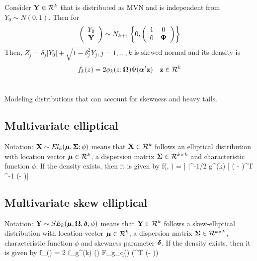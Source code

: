 \documentclass[11pt]{article}
\begin{document}
\linenumbers
\section*{\citep{Azzalini1996}}
Consider $\mbox{\bf Y} \in {\cal R}^k$ that is distributed as MVN and is independent from $Y_0 \sim N(0, 1)$. Then for
\begin{align}
\left( \begin{array}{c}
    Y_0\\
    \mbox{\bf Y}
\end{array} \right)
\sim
N_{k + 1} \left\{ 0, \left( 
    \begin{array}{c c}
    1 & 0 \\
    0 & \mbox{\boldmath $\Psi$}
    \end{array}
\right) \right\}
\end{align}
Then, $Z_j = \delta_j |Y_0| + \sqrt{ 1 - \delta_j^2} Y_j, j = 1, \ldots, k$ is skewed normal and its density is
\begin{align}
    f_k(z) = 2 \phi_k (z; \mbox{\boldmath $\Omega$}) \Phi (\mbox{\boldmath $\alpha$}^t \mbox{\bf z}) \quad \mbox{\bf z} \in {\cal R}^k
\end{align}

\section*{\citep{Azzalini1999}}

\section*{\citep{Branco2001}}
Modeling distributions that can account for skewness and heavy tails.

\subsection*{Multivariate elliptical}
Notation: $\mbox{\bf X} \sim El_k(\mbox{\boldmath $\mu$}, \mbox{\boldmath $\Sigma$}; \phi)$ means that $\mbox{\bf X} \in {\cal R}^k$ follows an elliptical distribution with location vector $\mbox{\boldmath $\mu$} \in {\cal R}^k$, a dispersion matrix $\mbox{\boldmath $\Sigma$} \in {\cal R}^{k \times k}$ and characteristic function $\phi$.
If the density exists, then it is given by
\beqn
    f(\bx \mid \bmu, \bSigma) = | \bSigma |^{-1/2} g^{(k)} [ ( \bx - \bmu)^T \bSigma^{-1} (\bx - \bmu)]
\eeqn

\subsection*{Multivariate skew elliptical}
Notation: $\mbox{\bf Y} \sim SE_k(\mbox{\boldmath $\mu$}, \mbox{\boldmath $\Omega$}, \mbox{\boldmath $\delta$}; \phi)$ means that $\mbox{\bf Y} \in {\cal R}^k$ follows a skew-elliptical distribution with location vector $\mbox{\boldmath $\mu$} \in {\cal R}^k$, a dispersion matrix $\mbox{\boldmath $\Sigma$} \in {\cal R}^{k \times k}$, characteristic function $\phi$ and skewness parameter $\mbox{\boldmath $\delta$}$.
If the density exists, then it is given by
\beqn
    f_{\bY}(\by) = 2 f_{g^(k)} (\by) F_{g_{q(\by)}} (\blambda^T (\by - \bmu))
\eeqn
\end{document}
